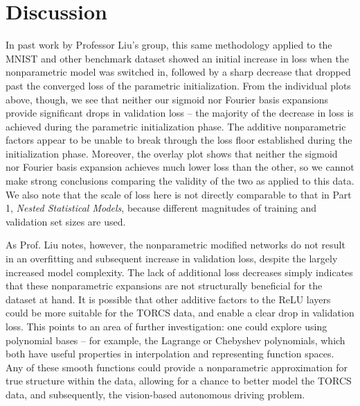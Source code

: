 \documentclass[master]{subfiles}
\begin{document}
\section{Discussion}
In past work by Professor Liu's group, this same methodology applied to the MNIST and other benchmark dataset showed an initial increase in loss when the nonparametric model was switched in, followed by a sharp decrease that dropped past the converged loss of the parametric initialization.  From the individual plots above, though, we see that neither our sigmoid nor Fourier basis expansions provide significant drops in validation loss -- the majority of the decrease in loss is achieved during the parametric initialization phase.   The additive nonparametric factors appear to be unable to break through the loss floor established during the initialization phase.  Moreover, the overlay plot shows that neither the sigmoid nor Fourier basis expansion achieves much lower loss than the other, so we cannot make strong conclusions comparing the validity of the two as applied to this data.  We also note that the scale of loss here is not directly comparable to that in Part 1, \textit{Nested Statistical Models}, because different magnitudes of training and validation set sizes are used.\par
As Prof. Liu notes, however, the nonparametric modified networks do not result in an overfitting and subsequent increase in validation loss, despite the largely increased model complexity.  The lack of additional loss decreases simply indicates that these nonparametric expansions are not structurally beneficial for the dataset at hand.  It is possible that other additive factors to the ReLU layers could be more suitable for the TORCS data, and enable a clear drop in validation loss.  This points to an area of further investigation:  one could explore using polynomial bases -- for example, the Lagrange or Chebyshev polynomials, which both have useful properties in interpolation and representing function spaces.  Any of these smooth functions could provide a nonparametric approximation for true structure within the data, allowing for a chance to better model the TORCS data, and subsequently, the vision-based autonomous driving problem.
\end{document}

